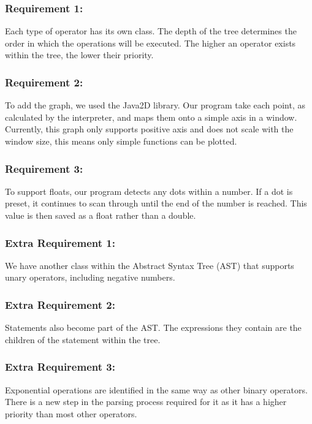 \documentclass[a4paper, oneside, 11pt]{report}
\begin{document}
\subsubsection{Requirement 1:}

Each type of operator has its own class. The depth of the tree determines the order in which the operations will be executed. The higher an operator exists within the tree, the lower their priority.

\subsubsection {Requirement 2:}

To add the graph, we used the Java2D library. Our program take each point, as calculated by the interpreter, and maps them onto a simple axis in a window. Currently, this graph only supports positive axis and does not scale with the window size, this means only simple functions can be plotted.

\subsubsection {Requirement 3:}

To support floats, our program detects any dots within a number. If a dot is preset, it continues to scan through until the end of the number is reached. This value is then saved as a float rather than a double.

\subsubsection {Extra Requirement 1:}

We have another class within the Abstract Syntax Tree (AST) that supports unary operators, including negative numbers.

\subsubsection {Extra Requirement 2:}

Statements also become part of the AST. The expressions they contain are the children of the statement within the tree.

\subsubsection {Extra Requirement 3:}

Exponential operations are identified in the same way as other binary operators. There is a new step in the parsing process required for it as it has a higher priority than most other operators.
\end{document}
